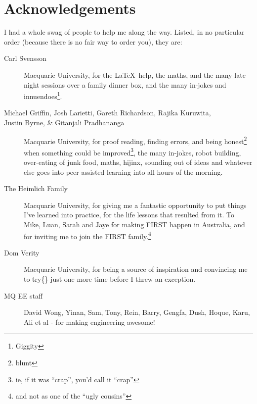 \chapter{Acknowledgements}
\label{chap:Acknowledgements}
I had a whole swag of people to help me along the way. Listed, in no particular
order (because there is no fair way to order you), they are:
\begin{description}
  \item[Carl Svensson] Macquarie University, for the \LaTeX~help, the maths, and
  the many late night sessions over a family dinner box, and the many in-jokes
  and innuendoes\footnote{Giggity}.
  
  \item[Michael Griffin, Josh Larietti, Gareth Richardson, Rajika Kuruwita,]
  \item[Justin Byrne, \& Gitanjali Pradhananga] Macquarie University, for proof
  reading, finding errors, and being honest\footnote{blunt} when something could
  be improved\footnote{ie,   if it was ``crap'', you'd call it ``crap''}, the
  many in-jokes, robot building, over-eating of junk food, maths, hijinx,
  sounding out of ideas and whatever else goes into peer assisted learning into
  all hours of the morning.
 
  \item[The Heimlich Family] Macquarie University, for giving me a fantastic
  opportunity to put things I've learned into practice, for the life lessons
  that resulted from it. To Mike, Luan, Sarah and Jaye for making FIRST happen
  in Australia, and for inviting me to join the FIRST family.\footnote{and not
  as one of the ``ugly cousins''}
  
  \item[Dom Verity] Macquarie University, for being a source of inspiration and
  convincing me to try\{\} just one more time before I threw an exception.
  
  \item[MQ EE staff] David Wong, Yinan,
  Sam, Tony, Rein, Barry, Gengfa, Dush, Hoque, Karu, Ali et al - for making
  engineering awesome!
  
  

\end{description}
